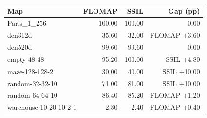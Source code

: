 \scriptsize
\setlength{\tabcolsep}{4pt}
\begin{tabular}{lrrr}
\toprule
Map & FLOMAP & SSIL & Gap (pp) \\
\midrule
Paris\_1\_256 & 100.00 & 100.00 & 0.00 \\
den312d & 35.60 & 32.00 & FLOMAP +3.60 \\
den520d & 99.60 & 99.60 & 0.00 \\
empty-48-48 & 95.20 & 100.00 & SSIL +4.80 \\
maze-128-128-2 & 30.00 & 40.00 & SSIL +10.00 \\
random-32-32-10 & 71.00 & 81.00 & SSIL +10.00 \\
random-64-64-10 & 86.40 & 85.20 & FLOMAP +1.20 \\
warehouse-10-20-10-2-1 & 2.80 & 2.40 & FLOMAP +0.40 \\
\bottomrule
\end{tabular}
